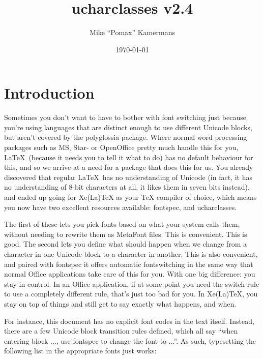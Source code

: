 \documentclass{article}
\begin{document}
  \title{ucharclasses v2.4}
  \author{Mike “Pomax” Kamermans}
  \date{\today}
  \maketitle

  \tableofcontents

  \pagebreak

  \section{Introduction}

    Sometimes you don't want to have to bother with font switching just because you're using languages that are distinct enough to use different Unicode blocks, but aren't covered by the polyglossia package. Where normal word processing packages such as MS, Star- or OpenOffice pretty much handle this for you, \LaTeX\ (because it needs you to tell it what to do) has no default behaviour for this, and so we arrive at a need for a package that does this for us. You already discovered that regular \LaTeX\ has no understanding of Unicode (in fact, it has no understanding of 8-bit characters at all, it likes them in seven bits instead), and ended up going for Xe(La)TeX as your TeX compiler of choice, which means you now have two excellent resources available: fontspec, and ucharclasses.

    The first of these lets you pick fonts based on what your system calls them, without needing to rewrite them as MetaFont files. This is convenient. This is good. The second lets you define what should happen when we change from a character in one Unicode block to a character in another. This is also convenient, and paired with fontspec it offers automatic fontswitching in the same way that normal Office applications take care of this for you. With one big difference: you stay in control. In an Office application, if at some point you need the switch rule to use a completely different rule, that's just too bad for you. In Xe(La)TeX, you stay on top of things and still get to say exactly what happens, and when.

    For instance, this document has no explicit font codes in the text itself. Instead, there are a few Unicode block transition rules defined, which all say “when entering block ..., use fontspec to change the font to ...”. As such, typesetting the following list in the appropriate fonts just works:
\end{document}
